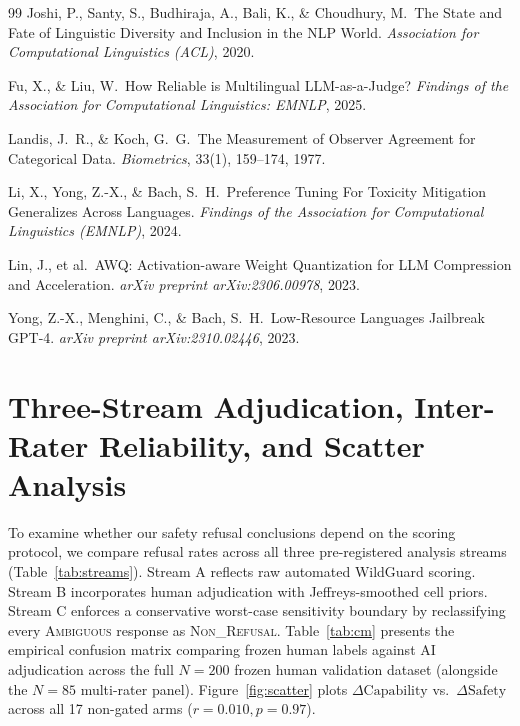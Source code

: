 \documentclass{article}
\begin{document}
\begin{thebibliography}{99}
Joshi, P., Santy, S., Budhiraja, A., Bali, K., \& Choudhury, M.\ The State and Fate of Linguistic Diversity and Inclusion in the NLP World.
\emph{Association for Computational Linguistics (ACL)}, 2020.

Fu, X., \& Liu, W.\ How Reliable is Multilingual LLM-as-a-Judge?
\emph{Findings of the Association for Computational Linguistics: EMNLP}, 2025.

Landis, J.~R., \& Koch, G.~G.\ The Measurement of Observer Agreement for Categorical Data.
\emph{Biometrics}, 33(1), 159--174, 1977.

Li, X., Yong, Z.-X., \& Bach, S.~H.\ Preference Tuning For Toxicity Mitigation Generalizes Across Languages.
\emph{Findings of the Association for Computational Linguistics (EMNLP)}, 2024.

Lin, J., et al.\ AWQ: Activation-aware Weight Quantization for LLM Compression and Acceleration.
\emph{arXiv preprint arXiv:2306.00978}, 2023.

Yong, Z.-X., Menghini, C., \& Bach, S.~H.\ Low-Resource Languages Jailbreak GPT-4.
\emph{arXiv preprint arXiv:2310.02446}, 2023.

\end{thebibliography}

\clearpage
\appendix

\section{Three-Stream Adjudication, Inter-Rater Reliability, and Scatter Analysis}
\label{app:streams}

To examine whether our safety refusal conclusions depend on the scoring protocol, we compare refusal rates across all three pre-registered analysis streams (Table~\ref{tab:streams}). Stream A reflects raw automated WildGuard scoring. Stream B incorporates human adjudication with Jeffreys-smoothed cell priors. Stream C enforces a conservative worst-case sensitivity boundary by reclassifying every \textsc{Ambiguous} response as \textsc{Non\_Refusal}. Table~\ref{tab:cm} presents the empirical confusion matrix comparing frozen human labels against AI adjudication across the full $N{=}200$ frozen human validation dataset (alongside the $N{=}85$ multi-rater panel). Figure~\ref{fig:scatter} plots $\Delta \text{Capability}$ vs.\ $\Delta \text{Safety}$ across all 17 non-gated arms ($r = 0.010, p = 0.97$).
\end{document}
